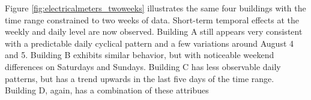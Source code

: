 Figure \ref{fig:electricalmeters_twoweeks} illustrates the same four buildings with the time range constrained to two weeks of data. Short-term temporal effects at the weekly and daily level are now observed. Building A still appears very consistent with a predictable daily cyclical pattern and a few variations around August 4 and 5. Building B exhibits similar behavior, but with noticeable weekend differences on Saturdays and Sundays. Building C has less observable daily patterns, but has a trend upwards in the last five days of the time range. Building D, again, has a combination of these attribues